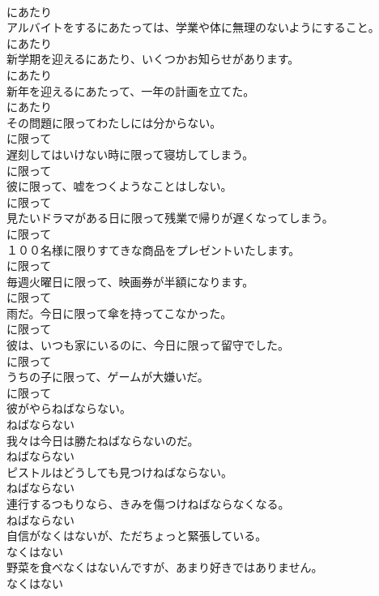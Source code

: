 \documentclass[8pt]{extreport}
\begin{document}
\begin{CJK}{UTF8}{min}
\\	にあたり
\\	アルバイトをするにあたっては、学業や体に無理のないようにすること。	
\\	にあたり
\\	新学期を迎えるにあたり、いくつかお知らせがあります。	
\\	にあたり
\\	新年を迎えるにあたって、一年の計画を立てた。	
\\	にあたり
\\	その問題に限ってわたしには分からない。	
\\	に限って
\\	遅刻してはいけない時に限って寝坊してしまう。	
\\	に限って
\\	彼に限って、嘘をつくようなことはしない。	
\\	に限って
\\	見たいドラマがある日に限って残業で帰りが遅くなってしまう。	
\\	に限って
\\	１００名様に限りすてきな商品をプレゼントいたします。	
\\	に限って
\\	毎週火曜日に限って、映画券が半額になります。	
\\	に限って
\\	雨だ。今日に限って傘を持ってこなかった。	
\\	に限って
\\	彼は、いつも家にいるのに、今日に限って留守でした。	
\\	に限って
\\	うちの子に限って、ゲームが大嫌いだ。	
\\	に限って
\\	彼がやらねばならない。	
\\	ねばならない
\\	我々は今日は勝たねばならないのだ。	
\\	ねばならない
\\	ピストルはどうしても見つけねばならない。	
\\	ねばならない
\\	連行するつもりなら、きみを傷つけねばならなくなる。	
\\	ねばならない
\\	自信がなくはないが、ただちょっと緊張している。	
\\	なくはない
\\	野菜を食べなくはないんですが、あまり好きではありません。	
\\	なくはない

\end{CJK}
\end{document}
